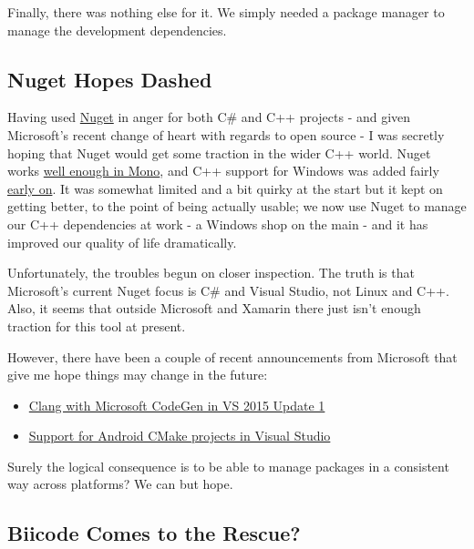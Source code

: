 \documentclass{book}
\begin{document}
Finally, there was nothing else for it. We simply needed a package
manager to manage the development dependencies.

\subsection*{Nuget Hopes Dashed}
\label{sec-2-3}

Having used \href{https://www.nuget.org/}{Nuget} in anger for both C\# and C++ projects - and given
Microsoft's recent change of heart with regards to open source - I was
secretly hoping that Nuget would get some traction in the wider C++
world. Nuget works \href{http://mcraveiro.blogspot.co.uk/2014/05/nerd-food-using-mono-in-anger-part-ii_3422.html}{well enough in Mono}, and C++ support for Windows
was added fairly \href{http://blogs.msdn.com/b/vcblog/archive/2013/04/26/nuget-for-c.aspx}{early on}. It was somewhat limited and a bit quirky at
the start but it kept on getting better, to the point of being
actually usable; we now use Nuget to manage our C++ dependencies at
work - a Windows shop on the main - and it has improved our quality of
life dramatically.

Unfortunately, the troubles begun on closer inspection. The truth is
that Microsoft's current Nuget focus is C\# and Visual Studio, not
Linux and C++. Also, it seems that outside Microsoft and Xamarin there
just isn't enough traction for this tool at present.

However, there have been a couple of recent announcements from
Microsoft that give me hope things may change in the future:

\begin{itemize}
\item \href{http://blogs.msdn.com/b/vcblog/archive/2015/12/04/introducing-clang-with-microsoft-codegen-in-vs-2015-update-1.aspx}{Clang with Microsoft CodeGen in VS 2015 Update 1}
\item \href{http://blogs.msdn.com/b/vcblog/archive/2015/12/15/support-for-android-cmake-projects-in-visual-studio.aspx}{Support for Android CMake projects in Visual Studio}
\end{itemize}

Surely the logical consequence is to be able to manage packages in a
consistent way across platforms? We can but hope.

\subsection*{Biicode Comes to the Rescue?}
\label{sec-2-4}
\end{document}
